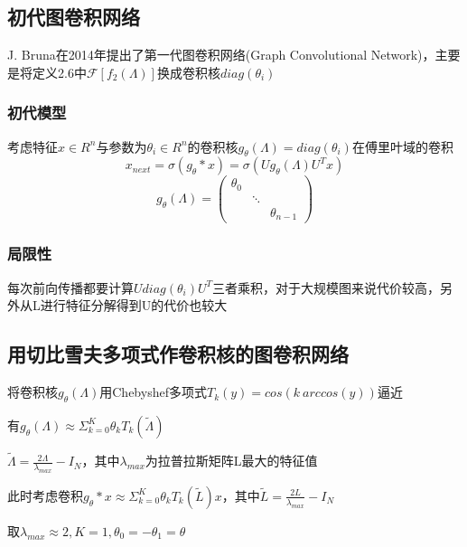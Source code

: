 \subsection{初代图卷积网络}
J. Bruna在2014年提出了第一代图卷积网络(Graph Convolutional Network)，主要是将定义2.6中$\mathcal{F}[f_2(\Lambda)]$换成卷积核$diag(\theta_i)$

\subsubsection{初代模型}
\begin{definition}
    考虑特征$x \in R^n$与参数为$\theta_i\in R^n$的卷积核$g_\theta(\Lambda)=diag(\theta_i)$在傅里叶域的卷积
    \begin{equation}
        x_{next}=\sigma (g_\theta*x)=\sigma (U g_\theta(\Lambda) U^Tx)
    \end{equation}
    \begin{equation}
        g_\theta(\Lambda)=\left(\begin{array}{ccc}
        \theta_{0} & & \\
        & \ddots & \\
        & & \theta_{n-1}
        \end{array}\right)
    \end{equation}
\end{definition}

\subsubsection{局限性}
每次前向传播都要计算$U diag(\theta_i) U^T$三者乘积，对于大规模图来说代价较高，另外从L进行特征分解得到U的代价也较大

\subsection{用切比雪夫多项式作卷积核的图卷积网络}
将卷积核$g_\theta(\Lambda)$用Chebyshef多项式$T_k(y)=cos(k\ arccos(y))$逼近

有$g_\theta(\Lambda)\approx \Sigma_{k=0}^K\theta_kT_k(\tilde \Lambda)$

$\tilde \Lambda=\frac{2\Lambda}{\lambda_{max}}-I_N$，其中$\lambda_{max}$为拉普拉斯矩阵L最大的特征值

此时考虑卷积$g_\theta*x\approx \Sigma_{k=0}^K\theta_kT_k(\tilde L)x$，其中$\tilde L=\frac{2L}{\lambda_{max}}-I_N$

取$\lambda_{max}\approx2,K=1,\theta_0=-\theta_1=\theta$

